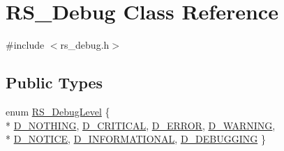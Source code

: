 \hypertarget{class_r_s___debug}{\section{R\-S\-\_\-\-Debug Class Reference}
\label{class_r_s___debug}
}


{\ttfamily \#include $<$rs\-\_\-debug.\-h$>$}

\subsection*{Public Types}
\begin{DoxyCompactItemize}
\item 
enum \hyperlink{class_r_s___debug_af13c679a07ad1548ce7624cb9a38d347}{R\-S\-\_\-\-Debug\-Level} \{ \\*
\hyperlink{class_r_s___debug_af13c679a07ad1548ce7624cb9a38d347a6f96f69c782e9365a75f786b0689e0d0}{D\-\_\-\-N\-O\-T\-H\-I\-N\-G}, 
\hyperlink{class_r_s___debug_af13c679a07ad1548ce7624cb9a38d347a31fbcef2256893672333b3af8a421f63}{D\-\_\-\-C\-R\-I\-T\-I\-C\-A\-L}, 
\hyperlink{class_r_s___debug_af13c679a07ad1548ce7624cb9a38d347aaa420acad59fb2d0c51e06db86aa15c5}{D\-\_\-\-E\-R\-R\-O\-R}, 
\hyperlink{class_r_s___debug_af13c679a07ad1548ce7624cb9a38d347ade46d1fa2d24963fc9e0fed60ede873d}{D\-\_\-\-W\-A\-R\-N\-I\-N\-G}, 
\\*
\hyperlink{class_r_s___debug_af13c679a07ad1548ce7624cb9a38d347affc1d0be81d6c48c59f067c723344732}{D\-\_\-\-N\-O\-T\-I\-C\-E}, 
\hyperlink{class_r_s___debug_af13c679a07ad1548ce7624cb9a38d347a3f6925a80a25c92800eb6083918d98b7}{D\-\_\-\-I\-N\-F\-O\-R\-M\-A\-T\-I\-O\-N\-A\-L}, 
\hyperlink{class_r_s___debug_af13c679a07ad1548ce7624cb9a38d347a502268ae511582769f65fbffd29158ad}{D\-\_\-\-D\-E\-B\-U\-G\-G\-I\-N\-G}
 \}
\end{DoxyCompactItemize}
